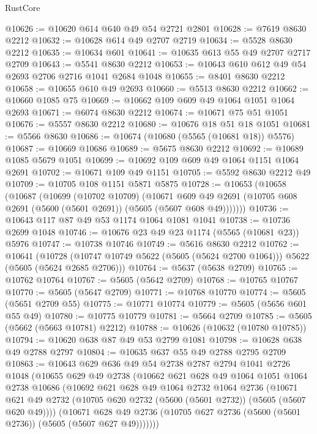 \begin{lexlean}{RustCore}
\begin{coremodule}
@10626 := @10620 @614 @640 @49 @54 @2721 @2801
@10628 := @7619 @8630 @2212
@10632 := @10628 @614 @49 @2707 @2719
@10634 := @5528 @8630 @2212
@10635 := @10634 @601
@10641 := @10635 @613 @55 @49 @2707 @2717 @2709
@10643 := @5541 @8630 @2212
@10653 := @10643 @610 @612 @49 @54 @2693 @2706 @2716 @1041 @2684 @1048
@10655 := @8401 @8630 @2212
@10658 := @10655 @610 @49 @2693
@10660 := @5513 @8630 @2212
@10662 := @10660 @1085 @75
@10669 := @10662 @109 @609 @49 @1064 @1051 @1064 @2693
@10671 := @6074 @8630 @2212
@10674 := @10671 @75 @51 @1051
@10676 := @5557 @8630 @2212
@10680 := @10676 @18 @51 @18 @1051
@10681 := @5566 @8630
@10686 := @10674 (@10680 (@5565 (@10681 @18)) @5576)
@10687 := @10669 @10686
@10689 := @5675 @8630 @2212
@10692 := @10689 @1085 @5679 @1051
@10699 := @10692 @109 @609 @49 @1064 @1151 @1064 @2691
@10702 := @10671 @109 @49 @1151
@10705 := @5592 @8630 @2212 @49
@10709 := @10705 @108 @1151 @5871 @5875
@10728 := @10653
    (@10658
      (@10687
        (@10699
          (@10702 @10709)
          (@10671
            @609
            @49
            @2691
            (@10705 @608 @2691 (@5600 (@5601 @2691)) (@5605 (@5607 @608 @49)))))))
@10736 := @10643 @117 @87 @49 @53 @1174 @1064 @1081 @1041
@10738 := @10736 @2699 @1048
@10746 := @10676 @23 @49 @23 @1174 (@5565 (@10681 @23)) @5976
@10747 := @10738 @10746
@10749 := @5616 @8630 @2212
@10762 := @10641
    (@10728 (@10747 @10749 @5622 (@5605 (@5624 @2700 @1064))) @5622 (@5605 (@5624 @2685 @2706)))
@10764 := @5637 (@5638 @2709)
@10765 := @10762 @10764
@10767 := @5605 (@5642 @2709)
@10768 := @10765 @10767
@10770 := @5605 (@5647 @2709)
@10771 := @10768 @10770
@10774 := @5605 (@5651 @2709 @55)
@10775 := @10771 @10774
@10779 := @5605 (@5656 @601 @55 @49)
@10780 := @10775 @10779
@10781 := @5664 @2709
@10785 := @5605 (@5662 (@5663 @10781) @2212)
@10788 := @10626 (@10632 (@10780 @10785))
@10794 := @10620 @638 @87 @49 @53 @2799 @1081
@10798 := @10628 @638 @49 @2788 @2797
@10804 := @10635 @637 @55 @49 @2788 @2795 @2709
@10863 := @10643
    @629
    @636
    @49
    @54
    @2738
    @2787
    @2794
    @1041
    @2726
    @1048
    (@10655
      @629
      @49
      @2738
      (@10662
        @621
        @628
        @49
        @1064
        @1051
        @1064
        @2738
        @10686
        (@10692
          @621
          @628
          @49
          @1064
          @2732
          @1064
          @2736
          (@10671 @621 @49 @2732 (@10705 @620 @2732 (@5600 (@5601 @2732)) (@5605 (@5607 @620 @49))))
          (@10671
            @628
            @49
            @2736
            (@10705 @627 @2736 (@5600 (@5601 @2736)) (@5605 (@5607 @627 @49)))))))

\end{coremodule}
\end{lexlean}

